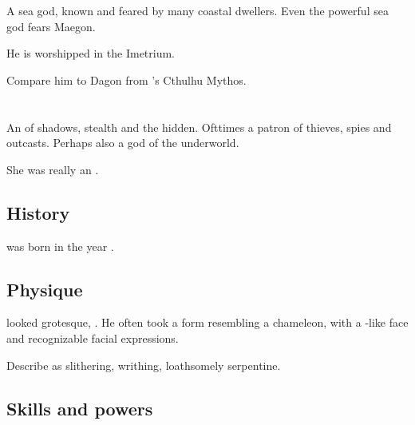 A sea god, known and feared by many coastal dwellers. 
Even the powerful sea god  fears Maegon. 

He is worshipped in the Imetrium. 

Compare him to Dagon from \HPLovecraft's Cthulhu Mythos. 















\section{\Nasshikerr}
\index{\Nasshikerr}
An  of shadows, stealth and the hidden. 
Ofttimes a patron of thieves, spies and outcasts. 
Perhaps also a god of the underworld.

She was really an \ophidian.









\subsection{History}
\Nasshikerr was born in the year .









\subsection{Physique}
\Nasshikerr looked grotesque, .
He often took a form resembling a chameleon, with a \scatha-like face and recognizable facial expressions. 

Describe \Nasshikerr as slithering, writhing, loathsomely serpentine.









\subsection{Skills and powers}





